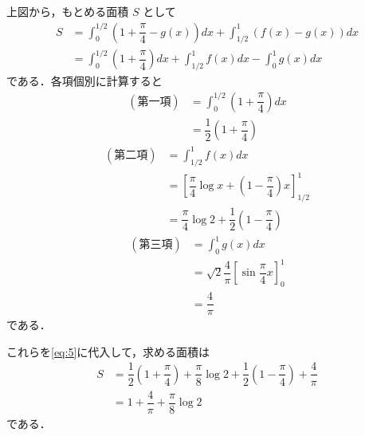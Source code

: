\documentclass[../../main.tex]{subfiles}
\begin{document}
上図から，もとめる面積 $S$ として
\begin{align}
  S
  &= \int_0^{1/2} \left(1 + \dfrac{\pi}{4} - g(x) \right) dx + \int_{1/2}^1 (f(x) - g(x)) dx \\
  &= \int_0^{1/2} \left(1 + \dfrac{\pi}{4}\right) dx + \int_{1/2}^1 f(x) dx - \int_0^1 g(x) dx \label{eq:5}
\end{align}
である．各項個別に計算すると
\begin{align}
  (\text{第一項})
  & = \int_0^{1/2} \left(1 + \dfrac{\pi}{4}\right) dx \\
  & = \dfrac{1}{2}\left(1 + \dfrac{\pi}{4}\right)
\end{align}
\begin{align}
  (\text{第二項})
  & = \int_{1/2}^1 f(x) dx \\
  & = \left[ \dfrac{\pi}{4}\log x + \left(1-\dfrac{\pi}{4}\right)x \right]_{1/2}^1 \\
  & = \dfrac{\pi}{4}\log 2 + \dfrac{1}{2}\left(1-\dfrac{\pi}{4}\right)
\end{align}
\begin{align}
  (\text{第三項})
  & =  \int_0^1 g(x) dx \\
  & = \sqrt{2} \dfrac{4}{\pi} \left[ \sin\dfrac{\pi}{4}x \right]_0^1 \\
  & = \dfrac{4}{\pi}
\end{align}
である．

これらを\cref{eq:5}に代入して，求める面積は
\begin{align}
  S
  &= \dfrac{1}{2}\left(1+\dfrac{\pi}{4}\right) + \dfrac{\pi}{8}\log 2 + \dfrac{1}{2}\left(1-\dfrac{\pi}{4}\right) + \dfrac{4}{\pi} \\
  &= 1 + \dfrac{4}{\pi} + \dfrac{\pi}{8}\log 2
\end{align}
である．
\end{document}
